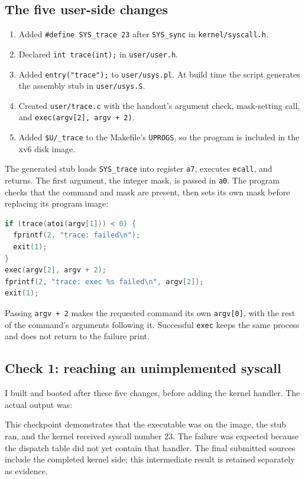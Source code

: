 \documentclass[12pt]{article}
\begin{document}
\subsection{The five user-side changes}
\begin{enumerate}
\item Added \texttt{\#define SYS\_trace 23} after \texttt{SYS\_sync} in
\texttt{kernel/syscall.h}.
\item Declared \texttt{int trace(int);} in \texttt{user/user.h}.
\item Added \texttt{entry("trace");} to \texttt{user/usys.pl}. At build
time the script generates the assembly stub in \texttt{user/usys.S}.
\item Created \texttt{user/trace.c} with the handout's argument check,
mask-setting call, and \texttt{exec(argv[2], argv + 2)}.
\item Added \texttt{\$U/\_trace} to the Makefile's \texttt{UPROGS}, so the
program is included in the xv6 disk image.
\end{enumerate}
The generated stub loads \texttt{SYS\_trace} into register \texttt{a7},
executes \texttt{ecall}, and returns. The first argument, the integer mask,
is passed in \texttt{a0}. The program checks that the command and mask are
present, then sets its own mask before replacing its program image:
\begin{lstlisting}[language=C]
if (trace(atoi(argv[1])) < 0) {
  fprintf(2, "trace: failed\n");
  exit(1);
}
exec(argv[2], argv + 2);
fprintf(2, "trace: exec %s failed\n", argv[2]);
exit(1);
\end{lstlisting}
Passing \texttt{argv + 2} makes the requested command its own
\texttt{argv[0]}, with the rest of the command's arguments following it.
Successful \texttt{exec} keeps the same process and does not return to the
failure print.

\subsection{Check 1: reaching an unimplemented syscall}
I built and booted after these five changes, before adding the kernel
handler. The actual output was:

This checkpoint demonstrates that the executable was on the image, the
stub ran, and the kernel received syscall number 23. The failure was
expected because the dispatch table did not yet contain that handler.
The final submitted sources include the completed kernel side; this
intermediate result is retained separately as evidence.
\end{document}
